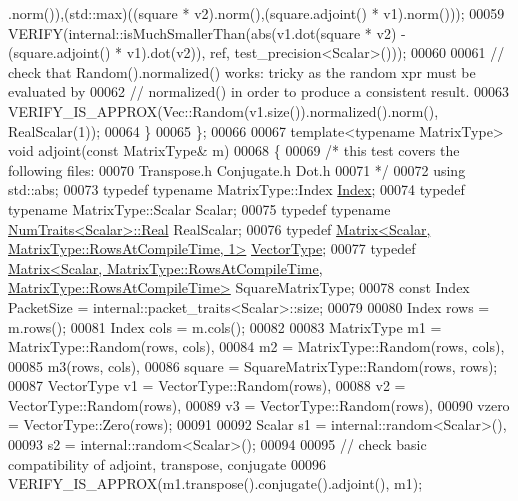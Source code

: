 \begin{DoxyCode}
      .norm()),(std::max)((square * v2).norm(),(square.adjoint() * v1).norm()));
00059     VERIFY(internal::isMuchSmallerThan(abs(v1.dot(square * v2) - (square.adjoint() * v1).dot(v2)), ref, 
      test\_precision<Scalar>()));
00060     
00061     \textcolor{comment}{// check that Random().normalized() works: tricky as the random xpr must be evaluated by}
00062     \textcolor{comment}{// normalized() in order to produce a consistent result.}
00063     VERIFY\_IS\_APPROX(Vec::Random(v1.size()).normalized().norm(), RealScalar(1));
00064   \}
00065 \};
00066 
00067 \textcolor{keyword}{template}<\textcolor{keyword}{typename} MatrixType> \textcolor{keywordtype}{void} adjoint(\textcolor{keyword}{const} MatrixType& m)
00068 \{
00069   \textcolor{comment}{/* this test covers the following files:}
00070 \textcolor{comment}{     Transpose.h Conjugate.h Dot.h}
00071 \textcolor{comment}{  */}
00072   \textcolor{keyword}{using} std::abs;
00073   \textcolor{keyword}{typedef} \textcolor{keyword}{typename} MatrixType::Index \hyperlink{namespace_eigen_a62e77e0933482dafde8fe197d9a2cfde}{Index};
00074   \textcolor{keyword}{typedef} \textcolor{keyword}{typename} MatrixType::Scalar Scalar;
00075   \textcolor{keyword}{typedef} \textcolor{keyword}{typename} \hyperlink{group___core___module_struct_eigen_1_1_num_traits}{NumTraits<Scalar>::Real} RealScalar;
00076   \textcolor{keyword}{typedef} \hyperlink{group___core___module_class_eigen_1_1_matrix}{Matrix<Scalar, MatrixType::RowsAtCompileTime, 1>} 
      \hyperlink{struct_vector_type}{VectorType};
00077   \textcolor{keyword}{typedef} 
      \hyperlink{group___core___module_class_eigen_1_1_matrix}{Matrix<Scalar, MatrixType::RowsAtCompileTime, MatrixType::RowsAtCompileTime>}
       SquareMatrixType;
00078   \textcolor{keyword}{const} Index PacketSize = internal::packet\_traits<Scalar>::size;
00079   
00080   Index rows = m.rows();
00081   Index cols = m.cols();
00082 
00083   MatrixType m1 = MatrixType::Random(rows, cols),
00084              m2 = MatrixType::Random(rows, cols),
00085              m3(rows, cols),
00086              square = SquareMatrixType::Random(rows, rows);
00087   VectorType v1 = VectorType::Random(rows),
00088              v2 = VectorType::Random(rows),
00089              v3 = VectorType::Random(rows),
00090              vzero = VectorType::Zero(rows);
00091 
00092   Scalar s1 = internal::random<Scalar>(),
00093          s2 = internal::random<Scalar>();
00094 
00095   \textcolor{comment}{// check basic compatibility of adjoint, transpose, conjugate}
00096   VERIFY\_IS\_APPROX(m1.transpose().conjugate().adjoint(),    m1);

\end{DoxyCode}
